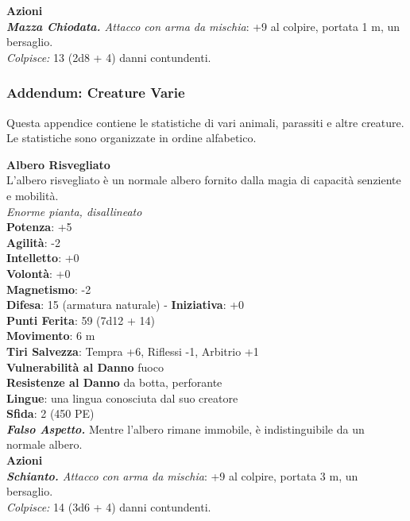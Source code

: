 \begin{multicols}{2}
\smallskip\textbf{Azioni}\\
\emph{\textbf{Mazza Chiodata.} Attacco con arma da mischia}: +9 al colpire, portata 1 m, un bersaglio.\\
\emph{Colpisce:} 13 (2d8 + 4) danni contundenti.\\

\pagebreak

\subsubsection{Addendum: Creature Varie}

Questa appendice contiene le statistiche di vari animali, parassiti e altre creature. Le statistiche sono organizzate in ordine alfabetico.

\medskip\textbf{Albero Risvegliato}\\
L'albero risvegliato è un normale albero fornito dalla magia di capacità senziente e mobilità.\\
\emph{Enorme pianta, disallineato}\\
\textbf{Potenza}: +5\\
\textbf{Agilità}: -2\\
\textbf{Intelletto}: +0\\
\textbf{Volontà}: +0\\
\textbf{Magnetismo}: -2\\
\textbf{Difesa}: 15 (armatura naturale) - \textbf{Iniziativa}: +0\\
\textbf{Punti Ferita}: 59 (7d12 + 14)\\
\textbf{Movimento}: 6 m\\
\textbf{Tiri Salvezza}: Tempra +6, Riflessi -1, Arbitrio +1\\
\textbf{Vulnerabilità al Danno} fuoco\\
\textbf{Resistenze al Danno} da botta, perforante\\
\textbf{Lingue}: una lingua conosciuta dal suo creatore\\
\textbf{Sfida}: 2 (450 PE)\smallskip\\
\emph{\textbf{Falso Aspetto.}} Mentre l'albero rimane immobile, è indistinguibile da un normale albero.\\
\smallskip\textbf{Azioni}\\
\emph{\textbf{Schianto.} Attacco con arma da mischia}: +9 al colpire, portata 3 m, un bersaglio.\\
\emph{Colpisce:} 14 (3d6 + 4) danni contundenti.\\


\end{multicols}
